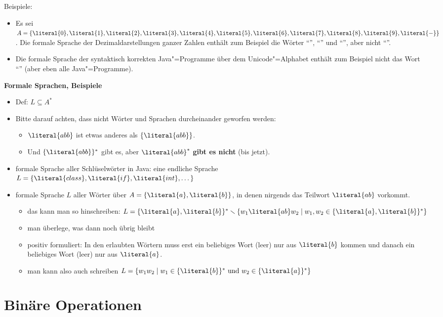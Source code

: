 Beispiele:
%
\begin{itemize}
\item Es sei $A=\{\literal{0}, \literal{1}, \literal{2}, \literal{3},
  \literal{4}, \literal{5}, \literal{6}, \literal{7}, \literal{8},
  \literal{9}, \literal{-} \}$. Die formale Sprache der
  Dezimaldarstellungen ganzer Zahlen enthält zum Beispiel die Wörter
  "`"', "`"' und "`"', aber
  nicht "`"'.
\item Die formale Sprache der syntaktisch korrekten Java"=Programme
  über dem Unicode"=Alphabet enthält zum Beispiel nicht das Wort
  "`"' (aber eben alle Java"=Programme).
\end{itemize}
%
\begin{tutorium}
  \noindent\textbf{Formale Sprachen, Beispiele}
  \begin{itemize}
  \item Def: $L\subseteq A^*$
  \item Bitte darauf achten, dass nicht Wörter und Sprachen
    durcheinander geworfen werden:
    \begin{itemize}
    \item $\literal{abb}$ ist etwas anderes als $\{\literal{abb}\}$.
    \item Und $\{\literal{abb}\}^*$ gibt es, aber $\literal{abb}^*$
      \textbf{gibt es nicht}  (bis jetzt).
    \end{itemize}
  \item formale Sprache aller Schlüselwörter in Java: eine endliche Sprache \\
    $L=\{ \literal{class},  \literal{if},  \literal{int}, \dots\}$
  \item formale Sprache $L$ aller Wörter über
    $A=\{\literal{a},\literal{b}\}$, in denen nirgends das Teilwort
    $\literal{ab}$ vorkommt.
    \begin{itemize}
    \item das kann man \zB so hinschreiben: $L=\{\literal{a},\literal{b}\}^*
      \smallsetminus \{w_1\literal{ab} w_2 \mid w_1,w_2\in
      \{\literal{a},\literal{b}\}^*\}$
    \item man überlege, was dann noch übrig bleibt
    \item positiv formuliert: In den erlaubten Wörtern muss
      erst ein beliebiges Wort (\evtl leer) nur aus $\literal{b}$ kommen und
      danach ein beliebiges Wort (\evtl leer) nur aus $\literal{a}$.
    \item man kann also auch schreiben $L=\{w_1w_2 \mid w_1\in
      \{\literal{b}\}^*  \text{ und }  w_2\in \{\literal{a}\}^* \}$
    \end{itemize}
  \end{itemize}
\end{tutorium}
\Tut\section{Bin\"are Operationen}
\label{sec:bin-op}

